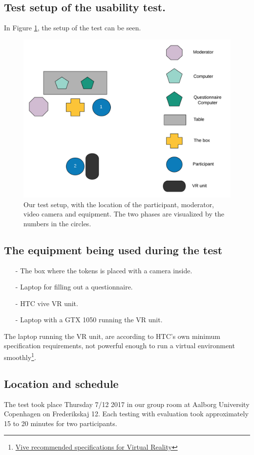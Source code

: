 \subsection{Test setup of the usability test.}
In Figure \ref{fig:test1}, the setup of the test can be seen.
\begin{figure}[H]
	\centering
	\includegraphics[width=1\linewidth]{figure/Evaluation/Test1.png}
	\caption{Our test setup, with the location of the participant, moderator, video camera and equipment. The two phases are visualized by the numbers in the circles.}
	\label{fig:test1}
\end{figure}

\subsection*{The equipment being used during the test}
\begin{itemize}
	\item[-] The box where the tokens is placed with a camera inside.
	\item[-] Laptop for filling out a questionnaire.
	\item[-] HTC vive VR unit.
	\item[-] Laptop with a GTX 1050 running the VR unit.
\end{itemize}
The laptop running the VR unit, are according to HTC's own minimum specification requirements, not powerful enough to run a virtual environment smoothly\footnote{\href{https://www.vive.com/us/ready/}{\color{blue}Vive recommended specifications for Virtual Reality}}.
\subsection*{Location and schedule}
The test took place Thursday 7/12 2017 in our group room at Aalborg University Copenhagen on Frederikskaj 12. Each testing with evaluation took approximately 15 to 20 minutes for two participants.

